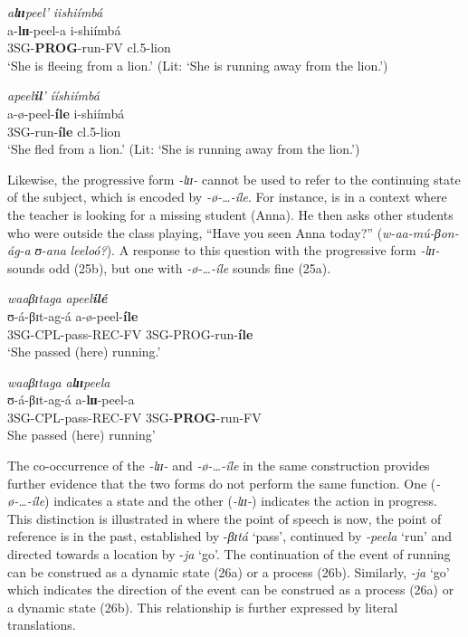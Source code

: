 \documentclass[output=paper,newtxmath,modfonts,nonflat,draftmode]{langsci/langscibook}
\begin{document}
\ea \label{ex:kanijo:24}
\ea 
\glll \textit{a}\textbf{\textit{l}}\textbf{\textit{ɪɪ}}\textit{peel’} \textit{iishiímbá}\\
  a-\textbf{lɪɪ}-peel-a              i-shiímbá\\
 3SG-\textbf{PROG}-run-FV cl.5-lion\\
\glt  ‘She is fleeing from a lion.’ (Lit: ‘She is running away from the lion.’)

\ex \glll *\textit{apeel}\textbf{\textit{il}}\textit{’}       \textit{ííshiímbá}\\
   a-ø-peel-\textbf{íle} i-shiímbá\\
   3SG-run-\textbf{íle}   cl.5-lion\\
  \glt ‘She fled from a lion.’ (Lit: ‘She is running away from the lion.’)
\z
\z

Likewise, the progressive form \textit{-lɪɪ}\textit{-} cannot be used to refer to the continuing state of the subject, which is encoded by \textit{-ø}\textit{-…-íle}. For instance,  is in a context where the teacher is looking for a missing student (Anna). He then asks other students who were outside the class playing, “Have you seen Anna today?” (\textit{w-aa-mú-βon-ág-a} \textit{ʊ-ana} \textit{leeloó?}). A response to this question with the progressive form \textit{-lɪɪ}\textit{-} sounds odd (25b), but one with \textit{-ø}\textit{-…-íle} sounds fine (25a).

\ea \label{ex:kanijo:25}
\ea \glll \textit{waaβɪ}\textit{taga}                   \textit{apeel}\textbf{\textit{ilé}}\\
\textbf{    }ʊ-á-βɪt-ag-á                 a-ø-peel-\textbf{íle}\\
 3SG-CPL-pass-REC-FV 3SG-PROG-run-\textbf{íle}\\
\glt  ‘She passed (here) running.’


\ex \glll *\textit{waaβɪ}\textit{taga}                   \textit{a}\textbf{\textit{l}}\textbf{\textit{ɪɪ}}\textit{peela}\\
   ʊ-á-βɪt-ag-á                a-\textbf{lɪɪ}-peel-a\\
   3SG-CPL-pass-REC-FV 3SG-\textbf{PROG}-run-FV \\
\glt    She passed (here) running’
\z
\z

The co-occurrence of the \textit{-lɪɪ}\textit{-} and \textit{-ø}\textit{-…-íle} in the same construction provides further evidence that the two forms do not perform the same function. One (\textit{-ø}\textit{-…-íle}) indicates a state and the other (\textit{-lɪɪ}\textit{-}) indicates the action in progress. This distinction is illustrated in  where the point of speech is now, the point of reference is in the past, established by -\textit{βɪ}\textit{tá} ‘pass’, continued by \textit{-peela} ‘run’ and directed towards a location by -\textit{ja} ‘go’. The continuation of the event of running can be construed as a dynamic state (26a) or a process (26b). Similarly, \textit{-ja} ‘go’ which indicates the direction of the event can be construed as a process (26a) or a dynamic state (26b). This relationship is further expressed by literal translations. 
\end{document}
